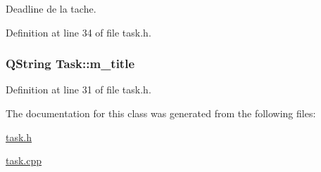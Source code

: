 Deadline de la tache. 



Definition at line 34 of file task.\+h.

\hypertarget{class_task_aa9c0fa08a6d4bb6b7390b69ba15baff2}{}
\subsubsection[{m\+\_\+title}]{\setlength{\rightskip}{0pt plus 5cm}Q\+String Task\+::m\+\_\+title\hspace{0.3cm}{\ttfamily [protected]}}\label{class_task_aa9c0fa08a6d4bb6b7390b69ba15baff2}


Definition at line 31 of file task.\+h.



The documentation for this class was generated from the following files\+:\begin{DoxyCompactItemize}
\item 
\hyperlink{task_8h}{task.\+h}\item 
\hyperlink{task_8cpp}{task.\+cpp}\end{DoxyCompactItemize}
